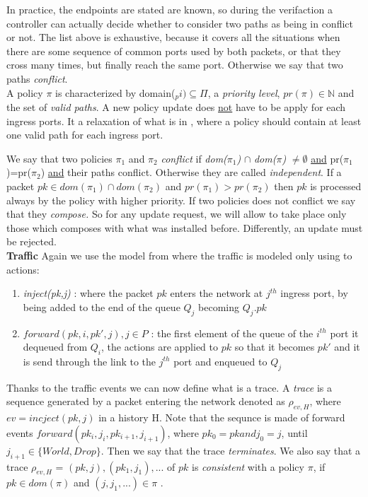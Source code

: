 \documentclass{article}
\begin{document}
    In practice, the endpoints are stated are known, so during the verifaction a controller can actually decide whether to consider two paths as being in conflict or not.
    The list above is exhaustive, because it covers all the situations when there are some sequence of common ports used by both packets, or that they cross many times, but finally reach the same port. Otherwise we say that two paths \emph{conflict}.\\
    A policy $\pi$ is characterized by domain($_pi)\subseteq\Pi$, a \emph{priority level}, $pr(\pi)\in\mathbb{N}$ and the set of \emph{valid paths}. A new policy update does \underline{not} have to be apply for each ingress ports. It a relaxation of what is in \cite{CKLS15}, where a policy should contain at least one valid path for each ingress port.
    
We say that two policies $\pi_1$ and $\pi_2$ \emph{conflict} if \emph{dom($\pi_1$)} $\cap$ \emph{dom($\pi$)} $\neq \emptyset$ \underline{and} pr($\pi_1$)=pr($\pi_2$) \underline{and} their paths conflict. Otherwise they are called \emph{independent}.
If a packet $pk\in dom(\pi_1) \cap dom(\pi_2)$ and $pr(\pi_1)>pr(\pi_2)$ then $pk$ is processed always by the policy with higher priority. 
If two policies does not conflict we say that they \emph{compose.} So for any update request, we will allow to take place only those which composes with what was installed before. Differently, an update must be rejected.  \\
\textbf{Traffic} Again we use the model from \cite{CKLS15} where the traffic is modeled only using to actions:
\begin{enumerate}
\item \emph{inject(pk,j)} : where the packet $pk$ enters the network at $j^{th}$ ingress port, by being added to the end of the queue $Q_j$ becoming $Q_j.pk$
\item $forward(pk,i,pk',j), j\in P$ : the first element of the queue of the $i^{th}$ port it dequeued from $Q_i$, the actions are applied to $pk$ so that it becomes $pk'$ and it is send through the link to the $j^{th}$ port and enqueued to $Q_j$
\end{enumerate}
Thanks to the traffic events we can now define what is a trace. A \emph{trace} is a sequence generated by a packet entering the network denoted as $\rho_{ev,H}$, where $ev = incject(pk,j)$ in a history H. Note that the sequnce is made of forward events $forward(pk_i,j_i,pk_{i+1},j_{i+1})$, where $pk_0=pk \textit{and} j_0=j$, until $j_{i+1} \in\lbrace World, Drop \rbrace$. Then we say that the trace \emph{terminates}.
We also say that a trace $\rho_{ev,H}$ = $(pk,j),(pk_1,j_1),...$ of $pk$ is \emph{consistent} with a policy $\pi$, if $pk\in dom(\pi)$ and $(j,j_1,...)\in \pi$ \cite{CKLS15}.
\end{document}
